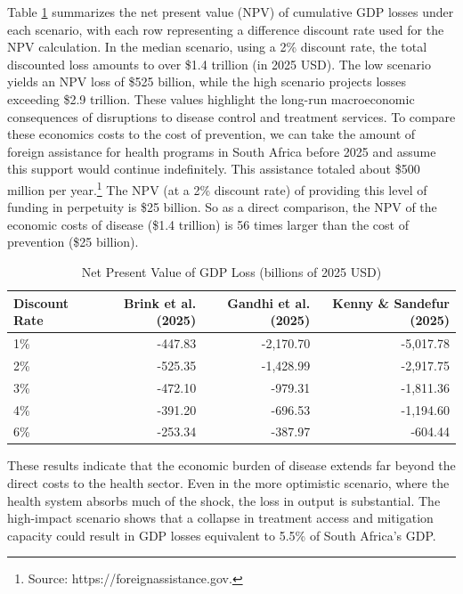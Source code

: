 \documentclass[letterpaper,12pt]{article}
\theoremstyle{definition}
\begin{document}
\begin{spacing}{1.5}
Table \ref{tab:NPVLosses} summarizes the net present value (NPV) of cumulative GDP losses under each scenario, with each row representing a difference discount rate used for the NPV calculation. In the median scenario, using a 2\% discount rate, the total discounted loss amounts to over \$1.4 trillion (in 2025 USD). The low scenario yields an NPV loss of \$525 billion, while the high scenario projects losses exceeding \$2.9 trillion. These values highlight the long-run macroeconomic consequences of disruptions to disease control and treatment services.  To compare these economics costs to the cost of prevention, we can take the amount of foreign assistance for health programs in South Africa before 2025 and assume this support would continue indefinitely. This assistance totaled about \$500 million per year.\footnote{Source: https://foreignassistance.gov.} The NPV (at a 2\% discount rate) of providing this level of funding in perpetuity is \$25 billion.  So as a direct comparison, the NPV of the economic costs of disease (\$1.4 trillion) is 56 times larger than the cost of prevention (\$25 billion).

\begin{table}[H]
\centering
\caption{Net Present Value of GDP Loss (billions of 2025 USD)}
\begin{tabular}{lrrr}
  \toprule
 Discount Rate & Brink et al. (2025) & Gandhi et al. (2025) & Kenny \& Sandefur (2025) \\
  \midrule
  1\% & -447.83 & -2,170.70 & -5,017.78 \\
  2\% & -525.35 & -1,428.99 & -2,917.75 \\
  3\% & -472.10 & -979.31 & -1,811.36 \\
  4\% & -391.20 & -696.53 & -1,194.60 \\
  6\% & -253.34 & -387.97 & -604.44 \\
  \bottomrule
\end{tabular}
\label{tab:NPVLosses}
\end{table}

These results indicate that the economic burden of disease extends far beyond the direct costs to the health sector. Even in the more optimistic scenario, where the health system absorbs much of the shock, the loss in output is substantial. The high-impact scenario shows that a collapse in treatment access and mitigation capacity could result in GDP losses equivalent to 5.5\% of South Africa's GDP.



\end{spacing}
\end{document}
